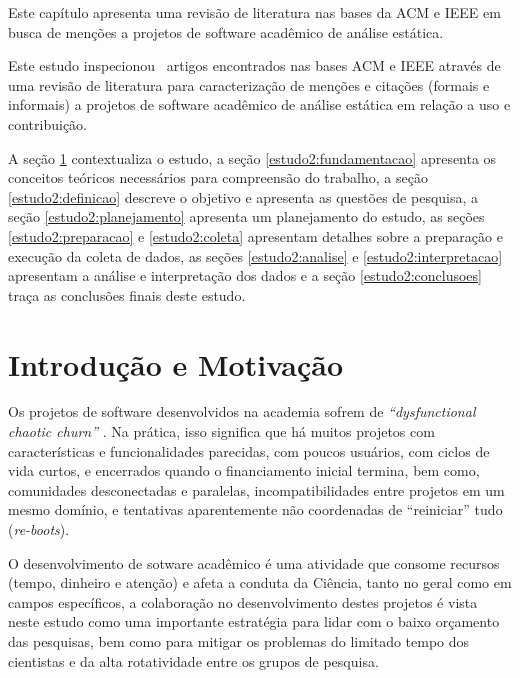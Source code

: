 {Este capítulo apresenta uma revisão de literatura nas bases da ACM e IEEE em
busca de menções a projetos de software acadêmico de análise estática.}
\label{estudo2}



Este estudo inspecionou \SearchUniqueCount \ artigos encontrados nas bases ACM
e IEEE através de uma revisão de literatura para caracterização de menções e
citações (formais e informais) a projetos de software acadêmico de análise
estática em relação a uso e contribuição.

A seção \ref{estudo2:introducao} contextualiza o estudo,
a seção \ref{estudo2:fundamentacao} apresenta os conceitos teóricos necessários para compreensão do trabalho,
a seção \ref{estudo2:definicao} descreve o objetivo e apresenta as questões de pesquisa,
a seção \ref{estudo2:planejamento} apresenta um planejamento do estudo,
as seções \ref{estudo2:preparacao} e \ref{estudo2:coleta} apresentam detalhes sobre a preparação e execução da coleta de dados,
as seções \ref{estudo2:analise} e \ref{estudo2:interpretacao} apresentam a análise e interpretação dos dados e
a seção \ref{estudo2:conclusoes} traça as conclusões finais deste estudo.

\section{Introdução e Motivação} \label{estudo2:introducao} %

Os projetos de software desenvolvidos na academia sofrem de {\it
``dysfunctional chaotic churn''} \cite{howison2015understanding}.
Na prática, isso significa que há muitos projetos com características e
funcionalidades parecidas, com poucos usuários, com ciclos de vida curtos, e
encerrados quando o financiamento inicial termina, bem como, comunidades
desconectadas e paralelas, incompatibilidades entre projetos em um mesmo
domínio, e tentativas aparentemente não coordenadas de ``reiniciar'' tudo ({\it re-boots}). 

O desenvolvimento de sotware acadêmico é uma atividade que consome recursos
(tempo, dinheiro e atenção) e afeta a conduta da Ciência, tanto no geral como
em campos específicos, a colaboração no desenvolvimento destes projetos é vista
neste estudo como uma importante estratégia para lidar com o baixo orçamento
das pesquisas, bem como para mitigar os problemas do limitado tempo dos
cientistas e da alta rotatividade entre os grupos de pesquisa.


